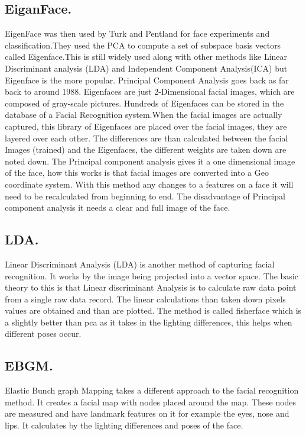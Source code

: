 \documentclass[journal]{IEEEtran}
\begin{document}
\subsection{EiganFace.}
EigenFace was then used by Turk and Pentland for face experiments and classification.They used the PCA to compute a set of subspace basis vectors called Eigenface.This is still widely used along with other methods like Linear Discriminant analysis (LDA) and Independent Component Analysis(ICA) but Eigenface is the more popular.
Principal Component Analysis goes back as far back to around 1988. Eigenfaces are just 2-Dimensional facial images, which are composed of gray-scale pictures\cite{eigen}.
Hundreds of Eigenfaces can be stored in the database of a Facial Recognition system.When the facial images are actually captured, this library of Eigenfaces are placed over the facial images, they are layered over each other. The differences are than calculated between the facial Images (trained) and the Eigenfaces, the different weights are taken down are noted down. The Principal component analysis gives it a one dimensional image of the face, how this works is that facial images are converted into a Geo coordinate system. With this method any changes to a features on a face it will need to be recalculated from beginning to end. The disadvantage of Principal component analysis it needs a clear and full image of the face\cite{pca}.     

\subsection{LDA.}
Linear Discriminant Analysis (LDA) is another method of capturing facial recognition. It works by the image being projected into a vector space. The basic theory to this is that Linear discriminant Analysis is to calculate raw data point from a single raw data record. The linear calculations than taken down pixels values are obtained and than are plotted. The method is called fisherface which is a slightly better than pca as it takes in the lighting differences, this helps when different poses occur\cite{pca}.

\subsection{EBGM.}
Elastic Bunch graph Mapping takes a different approach to the facial recognition method. It creates a facial map with nodes placed around the map. These nodes are measured and have landmark features on it for example the eyes, nose and lips. It calculates by the lighting differences and poses of the face\cite{methods}.
\end{document}
